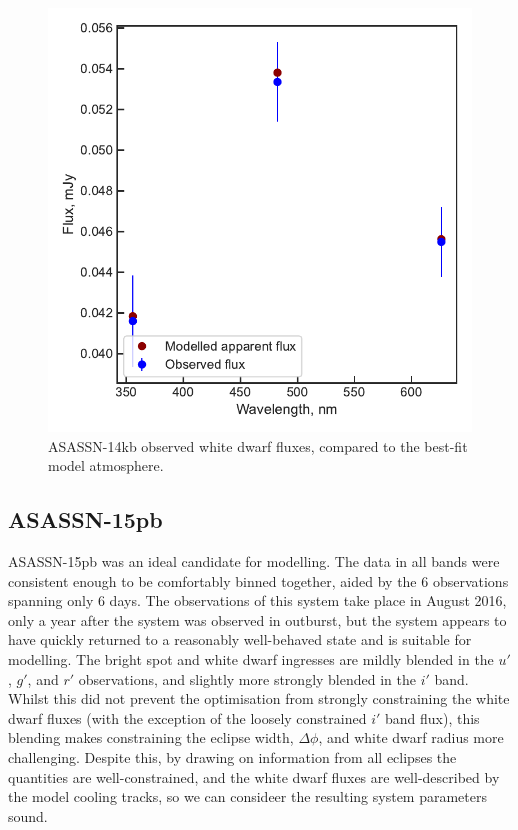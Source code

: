 \begin{figure}
    \centering
    \includegraphics[width=\textwidth]{figures/results/ASASSN-14kb/fluxplot.pdf}
    \caption{ASASSN-14kb observed white dwarf fluxes, compared to the best-fit model atmosphere.}
    \label{fig:ASASSN-14kb flux plot}
\end{figure}
\clearpage



\newpage
\subsection{ASASSN-15pb}

ASASSN-15pb was an ideal candidate for modelling. The data in all bands were consistent enough to be comfortably binned together, aided by the 6 observations spanning only 6 days.
The observations of this system take place in August 2016, only a year after the system was observed in outburst, but the system appears to have quickly returned to a reasonably well-behaved state and is suitable for modelling.
The bright spot and white dwarf ingresses are mildly blended in the $u'$, $g'$, and $r'$ observations, and slightly more strongly blended in the $i'$ band. Whilst this did not prevent the optimisation from strongly constraining the white dwarf fluxes (with the exception of the loosely constrained $i'$ band flux), this blending makes constraining the eclipse width, $\Delta\phi$, and white dwarf radius more challenging. Despite this, by drawing on information from all eclipses the quantities are well-constrained, and the white dwarf fluxes are well-described by the model cooling tracks, so we can consideer the resulting system parameters sound.


